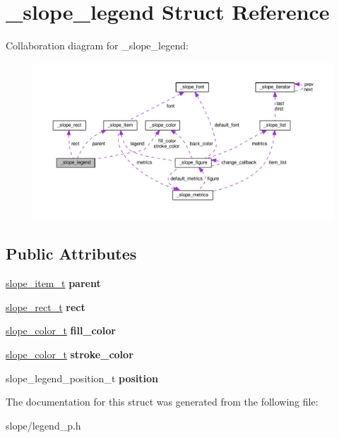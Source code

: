 \hypertarget{struct__slope__legend}{\section{\+\_\+slope\+\_\+legend Struct Reference}
\label{struct__slope__legend}
}


Collaboration diagram for \+\_\+slope\+\_\+legend\+:
\nopagebreak
\begin{figure}[H]
\begin{center}
\leavevmode
\includegraphics[width=350pt]{struct__slope__legend__coll__graph}
\end{center}
\end{figure}
\subsection*{Public Attributes}
\begin{DoxyCompactItemize}
\item 
\hypertarget{struct__slope__legend_aced1e1584bd8ba4cbe7ffc3ad0dadc44}{\hyperlink{group__Item_ga2616141f0e164a876049da51ea3a8646}{slope\+\_\+item\+\_\+t} {\bfseries parent}}\label{struct__slope__legend_aced1e1584bd8ba4cbe7ffc3ad0dadc44}

\item 
\hypertarget{struct__slope__legend_ae18a7deffb619252b055672110703bb9}{\hyperlink{struct__slope__rect}{slope\+\_\+rect\+\_\+t} {\bfseries rect}}\label{struct__slope__legend_ae18a7deffb619252b055672110703bb9}

\item 
\hypertarget{struct__slope__legend_a1abf347ffdf1ce3630e03ef93bc79a3b}{\hyperlink{struct__slope__color}{slope\+\_\+color\+\_\+t} {\bfseries fill\+\_\+color}}\label{struct__slope__legend_a1abf347ffdf1ce3630e03ef93bc79a3b}

\item 
\hypertarget{struct__slope__legend_a9be59a3fcd403e9455211399c9dabe9e}{\hyperlink{struct__slope__color}{slope\+\_\+color\+\_\+t} {\bfseries stroke\+\_\+color}}\label{struct__slope__legend_a9be59a3fcd403e9455211399c9dabe9e}

\item 
\hypertarget{struct__slope__legend_aac6517fed40bc604f90d188c88c39c8b}{slope\+\_\+legend\+\_\+position\+\_\+t {\bfseries position}}\label{struct__slope__legend_aac6517fed40bc604f90d188c88c39c8b}

\end{DoxyCompactItemize}


The documentation for this struct was generated from the following file\+:\begin{DoxyCompactItemize}
\item 
slope/legend\+\_\+p.\+h\end{DoxyCompactItemize}
